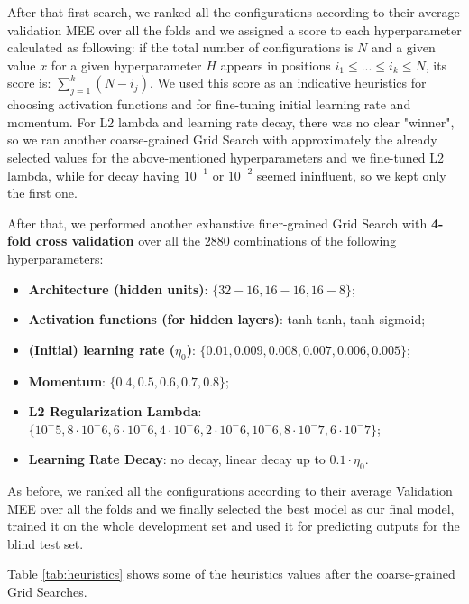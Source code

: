 After that first search, we ranked all the configurations according to their average validation MEE over all the folds and we assigned a score to each hyperparameter calculated as following: if the total number of configurations is $N$ and a given value $x$ for a given hyperparameter $H$ appears in positions $i_1 \leq ... \leq i_k \leq N$, its score is: $\sum_{j=1}^{k}{(N - i_j)}$. We used this score as an indicative heuristics for choosing activation functions and for fine-tuning initial learning rate and momentum. For L2 lambda and learning rate decay, there was no clear "winner", so we ran another coarse-grained Grid Search with approximately the already selected values for the above-mentioned hyperparameters and we fine-tuned L2 lambda, while for decay having $10^{-1}$ or $10^{-2}$ seemed ininfluent, so we kept only the first one.

After that, we performed another exhaustive finer-grained Grid Search with \textbf{4-fold cross validation} over all the $2880$ combinations of the following hyperparameters:
\begin{itemize}
    \item \textbf{Architecture (hidden units)}: $\{32-16, 16-16, 16-8\}$;
    \item \textbf{Activation functions (for hidden layers)}: {tanh-tanh, tanh-sigmoid};
    \item \textbf{(Initial) learning rate ($\eta_0$)}: $\{0.01, 0.009, 0.008, 0.007, 0.006, 0.005\}$;
    \item \textbf{Momentum}: $\{0.4, 0.5, 0.6, 0.7, 0.8\}$;
    \item \textbf{L2 Regularization Lambda}: $\{10^-5, 8\cdot10^-6, 6\cdot10^-6, 4\cdot10^-6, 2\cdot10^-6, 10^-6, 8\cdot10^-7, 6\cdot10^-7\}$;
    \item \textbf{Learning Rate Decay}: {no decay, linear decay up to $0.1 \cdot \eta_0$}.
\end{itemize}
As before, we ranked all the configurations according to their average Validation MEE over all the folds and we finally selected the best model as our final model, trained it on the whole development set and used it for predicting outputs for the blind test set.

Table \ref{tab:heuristics} shows some of the heuristics values after the coarse-grained Grid Searches.

